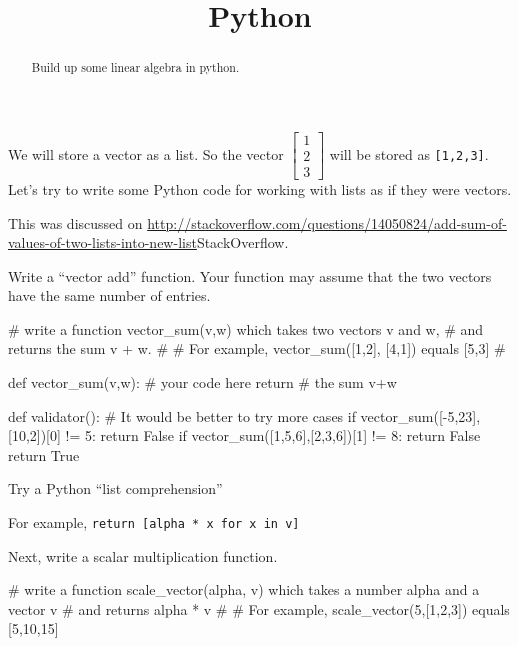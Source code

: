 \documentclass{ximera}
\title{Python}
\begin{document}
\begin{abstract}
  Build up some linear algebra in python.
\end{abstract}

\begin{exercise}
  We will store a vector as a list.  So the vector $\begin{bmatrix} 1 \\
    2 \\ 3\end{bmatrix}$ will be stored as \verb|[1,2,3]|.  Let's try
  to write some Python code for working with lists as if they were
  vectors.

\begin{solution}
  \begin{hint}
    This was discussed on \url{http://stackoverflow.com/questions/14050824/add-sum-of-values-of-two-lists-into-new-list}{StackOverflow}.
  \end{hint}

  Write a ``vector add'' function.  Your function may assume that the
  two vectors have the same number of entries.

\begin{python}
# write a function vector_sum(v,w) which takes two vectors v and w,
# and returns the sum v + w.
#
# For example, vector_sum([1,2], [4,1]) equals [5,3]
#
		
def vector_sum(v,w):
  # your code here
  return # the sum v+w

def validator():
  # It would be better to try more cases
  if vector_sum([-5,23],[10,2])[0] != 5:
    return False
  if vector_sum([1,5,6],[2,3,6])[1] != 8:
    return False
  return True

\end{python}
\end{solution}


\begin{solution}
  \begin{hint}
    Try a Python ``list comprehension''
  \end{hint}

  \begin{hint}
    For example, \verb|return [alpha * x for x in v]|
  \end{hint}

Next, write a scalar multiplication function.

\begin{python}
# write a function scale_vector(alpha, v) which takes a number alpha and a vector v
# and returns alpha * v
#
# For example, scale_vector(5,[1,2,3]) equals [5,10,15]
		

\end{python}
\end{solution}
\end{exercise}
\end{document}

